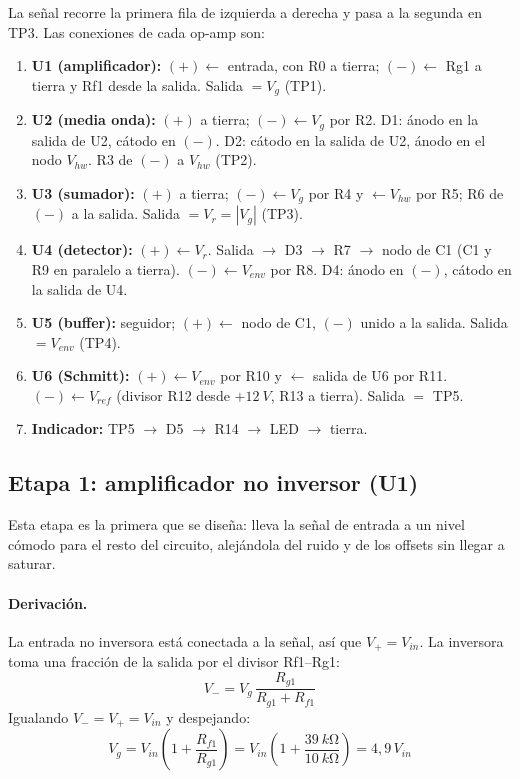 \documentclass[11pt,letterpaper]{article}
\newcommand{\Vg}{V_g}
\newcommand{\Vr}{V_r}
\newcommand{\Venv}{V_{env}}
\newcommand{\Vref}{V_{ref}}
\begin{document}
La señal recorre la primera fila de izquierda a derecha y pasa a la segunda en TP3. Las conexiones de cada op-amp son:
\begin{enumerate}
  \item \textbf{U1 (amplificador):} $(+)\leftarrow$ entrada, con R0 a tierra; $(-)\leftarrow$ Rg1 a tierra y Rf1 desde la salida. Salida $=\Vg$ (TP1).
  \item \textbf{U2 (media onda):} $(+)$ a tierra; $(-)\leftarrow\Vg$ por R2. D1: ánodo en la salida de U2, cátodo en $(-)$. D2: cátodo en la salida de U2, ánodo en el nodo $V_{hw}$. R3 de $(-)$ a $V_{hw}$ (TP2).
  \item \textbf{U3 (sumador):} $(+)$ a tierra; $(-)\leftarrow\Vg$ por R4 y $\leftarrow V_{hw}$ por R5; R6 de $(-)$ a la salida. Salida $=\Vr=|\Vg|$ (TP3).
  \item \textbf{U4 (detector):} $(+)\leftarrow\Vr$. Salida $\rightarrow$ D3 $\rightarrow$ R7 $\rightarrow$ nodo de C1 (C1 y R9 en paralelo a tierra). $(-)\leftarrow\Venv$ por R8. D4: ánodo en $(-)$, cátodo en la salida de U4.
  \item \textbf{U5 (buffer):} seguidor; $(+)\leftarrow$ nodo de C1, $(-)$ unido a la salida. Salida $=\Venv$ (TP4).
  \item \textbf{U6 (Schmitt):} $(+)\leftarrow\Venv$ por R10 y $\leftarrow$ salida de U6 por R11. $(-)\leftarrow\Vref$ (divisor R12 desde $+\SI{12}{V}$, R13 a tierra). Salida $=$ TP5.
  \item \textbf{Indicador:} TP5 $\rightarrow$ D5 $\rightarrow$ R14 $\rightarrow$ LED $\rightarrow$ tierra.
\end{enumerate}

\subsection{Etapa 1: amplificador no inversor (U1)}

Esta etapa es la primera que se diseña: lleva la señal de entrada a un nivel cómodo para el resto del circuito, alejándola del ruido y de los offsets sin llegar a saturar.

\paragraph{Derivación.} La entrada no inversora está conectada a la señal, así que $V_+=V_{in}$. La inversora toma una fracción de la salida por el divisor Rf1--Rg1:
\begin{equation}
V_- = \Vg\,\frac{R_{g1}}{R_{g1}+R_{f1}}
\end{equation}
Igualando $V_-=V_+=V_{in}$ y despejando:
\begin{equation}
\Vg = V_{in}\left(1+\frac{R_{f1}}{R_{g1}}\right) = V_{in}\left(1+\frac{\SI{39}{k\ohm}}{\SI{10}{k\ohm}}\right) = 4{,}9\,V_{in}
\label{eq:ganancia}
\end{equation}
\end{document}
